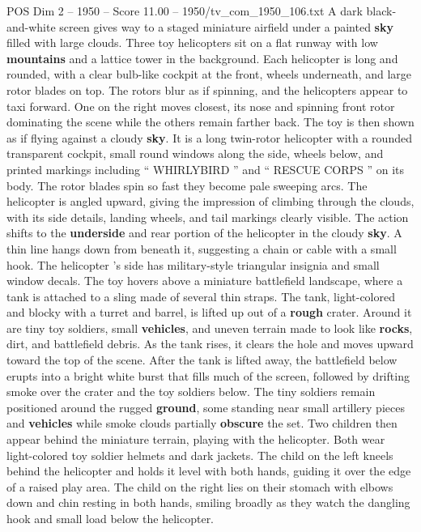 \begin{textsample}{POS Dim 2 – 1950 – Score 11.00 – 1950/tv\_com\_1950\_106.txt}  \label{ex:f2_pos_088}
A dark black-and-white screen gives way to a staged miniature airfield under a painted \textbf{sky} filled with large clouds.
Three toy helicopters sit on a flat runway with low \textbf{mountains} and a lattice tower in the background.
Each helicopter is long and rounded, with a clear bulb-like cockpit at the front, wheels underneath, and large rotor blades on top.
The rotors blur as if spinning, and the helicopters appear to taxi forward.
One on the right moves closest, its nose and spinning front rotor dominating the scene while the others remain farther back.
The toy is then shown as if flying against a cloudy \textbf{sky}.
It is a long twin-rotor helicopter with a rounded transparent cockpit, small round windows along the side, wheels below, and printed markings including “ WHIRLYBIRD ” and “ RESCUE CORPS ” on its body.
The rotor blades spin so fast they become pale sweeping arcs.
The helicopter is angled upward, giving the impression of climbing through the clouds, with its side details, landing wheels, and tail markings clearly visible.
The action shifts to the \textbf{underside} and rear portion of the helicopter in the cloudy \textbf{sky}.
A thin line hangs down from beneath it, suggesting a chain or cable with a small hook.
The helicopter ’s side has military-style triangular insignia and small window decals.
The toy hovers above a miniature battlefield landscape, where a tank is attached to a sling made of several thin straps.
The tank, light-colored and blocky with a turret and barrel, is lifted up out of a \textbf{rough} crater.
Around it are tiny toy soldiers, small \textbf{vehicles}, and uneven terrain made to look like \textbf{rocks}, dirt, and battlefield debris.
As the tank rises, it clears the hole and moves upward toward the top of the scene.
After the tank is lifted away, the battlefield below erupts into a bright white burst that fills much of the screen, followed by drifting smoke over the crater and the toy soldiers below.
The tiny soldiers remain positioned around the rugged \textbf{ground}, some standing near small artillery pieces and \textbf{vehicles} while smoke clouds partially \textbf{obscure} the set.
Two children then appear behind the miniature terrain, playing with the helicopter.
Both wear light-colored toy soldier helmets and dark jackets.
The child on the left kneels behind the helicopter and holds it level with both hands, guiding it over the edge of a raised play area.
The child on the right lies on their stomach with elbows down and chin resting in both hands, smiling broadly as they watch the dangling hook and small load below the helicopter.

\end{textsample}
